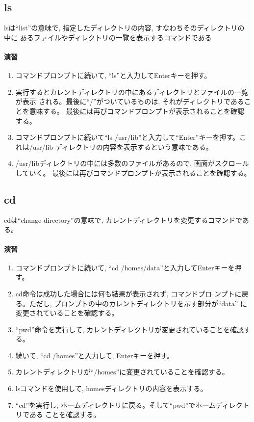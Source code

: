 \subsection{ls}

lsは``list''の意味で, 指定したディレクトリの内容, すなわちそのディレクトリの中に
あるファイルやディレクトリの一覧を表示するコマンドである

\paragraph{演習}
\begin{enumerate}
\item コマンドプロンプトに続いて, ``ls''と入力してEnterキーを押す。
\item 実行するとカレントディレクトリの中にあるディレクトリとファイルの一覧が表示
      される。最後に``/''がついているものは, それがディレクトリであることを意味する。
      最後には再びコマンドプロンプトが表示されることを確認する。
\item コマンドプロンプトに続いて``ls  /usr/lib''と入力して``Enter''キーを押す。これは/usr/lib
      ディレクトリの内容を表示するという意味である。
\item /usr/libディレクトリの中には多数のファイルがあるので, 画面がスクロールしていく。
      最後には再びコマンドプロンプトが表示されることを確認する。
\end{enumerate}

\subsection{cd}

cdは``change directory''の意味で, カレントディレクトリを変更するコマンドである。

\paragraph{演習}
\begin{enumerate}
\item コマンドプロンプトに続いて, ``cd  /homes/data''と入力してEnterキーを押す。
\item cd命令は成功した場合には何も結果が表示されず, コマンドプロ
ンプトに戻る。ただし, プロンプトの中のカレントディレクトリを示す部分が``data''
に変更されていることを確認する。
\item ``pwd''命令を実行して, カレントディレクトリが変更されていることを確認する。
\item 続いて, ``cd  /homes''と入力して, Enterキーを押す。
\item カレントディレクトリが``/homes''に変更されていることを確認する。
\item lsコマンドを使用して, homesディレクトリの内容を表示する。
\item ``cd''を実行し, ホームディレクトリに戻る。そして``pwd''でホームディレクトリである
      ことを確認する。
\end{enumerate}

